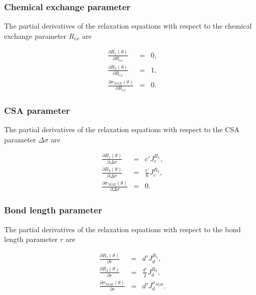 \subsubsection{Chemical exchange parameter}

The partial derivatives of the relaxation equations with respect to the chemical exchange parameter $R_{ex}$ are

\begin{eqnarray}
    \frac{\partial R_1(\theta)}{\partial R_{ex}} & = & 0,           \label{eq: Ri': dR1/dRex} \\
    \frac{\partial R_2(\theta)}{\partial R_{ex}} & = & 1,           \label{eq: Ri': dR2/dRex} \\
    \frac{\partial \sigma_{NOE}(\theta)}{\partial R_{ex}} & = & 0.  \label{eq: Ri': dsigmaNOE/dRex}
\end{eqnarray}


\subsubsection{CSA parameter}

The partial derivatives of the relaxation equations with respect to the CSA parameter $\Delta\sigma$ are

\begin{eqnarray}
    \frac{\partial R_1(\theta)}{\partial \Delta\sigma} & = & c' J_c^{R_1},              \label{eq: Ri': dR1/dCSA} \\
    \frac{\partial R_2(\theta)}{\partial \Delta\sigma} & = & \frac{c'}{6} J_c^{R_2},    \label{eq: Ri': dR2/dCSA} \\
    \frac{\partial \sigma_{NOE}(\theta)}{\partial \Delta\sigma} & = & 0.                \label{eq: Ri': dsigmaNOE/dCSA}
\end{eqnarray}


\subsubsection{Bond length parameter}

The partial derivatives of the relaxation equations with respect to the bond length parameter $r$ are

\begin{eqnarray}
    \frac{\partial R_1(\theta)}{\partial r} & = & d' J_d^{R_1},                     \label{eq: Ri': dR1/dr} \\
    \frac{\partial R_2(\theta)}{\partial r} & = & \frac{d'}{2} J_d^{R_2},           \label{eq: Ri': dR2/dr} \\
    \frac{\partial \sigma_{NOE}(\theta)}{\partial r} & = & d' J_d^{\sigma_{NOE}}.   \label{eq: Ri': dsigmaNOE/dr}
\end{eqnarray}


